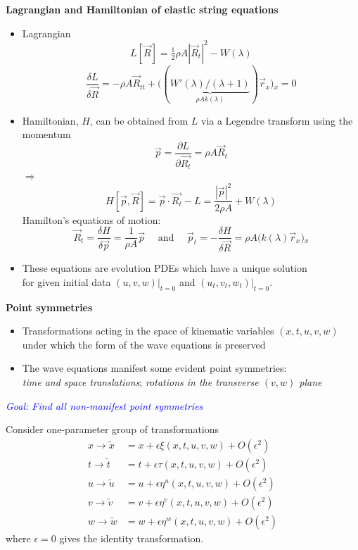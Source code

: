 \documentclass[landscape]{slides}
\def\myemph#1{\textcolor{blue}{\em #1}}
\begin{document}
\newpage
\begin{center}
\textbf{ Lagrangian and Hamiltonian of elastic string equations}
\end{center}
\begin{itemize}
\item
Lagrangian 
\[
L[\vec{R}] = \tfrac{1}{2}\rho A |\vec{R}_t|^2 - W(\lambda)
\]
\[
\frac{\delta L}{\delta \vec{R}} = -\rho A \vec{R}_{tt} + \big( (\underbrace{W'(\lambda) / (\lambda + 1)}_{\displaystyle \rho A k(\lambda) }) \vec{r}_x  \big){}_x = 0
\]
\item
Hamiltonian, $H$, can be obtained from $L$ via a Legendre transform using the momentum 
\[
\vec{p} = \dfrac{\partial L}{\partial \vec{R_t}} = \rho A \vec{R}_t
\]
$\Longrightarrow$
\[
H[\vec{p},\vec{R}] = \vec{p} \cdot \vec{R_t} - L 
= \frac{|\vec{p}|^2}{2 \rho A} + W(\lambda)
\]
Hamilton's equations of motion:
\[
\vec{R}_t = \frac{\delta H}{\delta \vec{p}} = \frac{1}{\rho A}\vec{p}
\quad\text{  and }\quad
\vec{p}_t = -\frac{\delta H}{\delta \vec{R}} 
= \rho A \big( k(\lambda) \vec{r}_x  \big){}_x 
\]
\item
These equations are evolution PDEs which have a unique solution\\
for given initial data $(u,v,w)\big|_{t=0}$ and $(u_t,v_t,w_t)\big|_{t=0}$. 
\end{itemize}


\newpage
\begin{center}
\textbf{Point symmetries}
\end{center}

\begin{itemize}
\item 
Transformations acting in the space of kinematic variables $(x,t,u,v,w)$
under which the form of the wave equations is preserved 
\item 
The wave equations manifest some evident point symmetries: \\
\emph{time and space translations}; \emph{rotations in the transverse $(v,w)$ plane}
\end{itemize}
\hfil

\begin{center}
\myemph{Goal: Find all non-manifest point symmetries}
\end{center}
\hfil

Consider one-parameter group of transformations 
\begin{align*}
x \to \tilde{x} & = x + \epsilon \xi(x,t,u,v,w) + O(\epsilon^2) \\
t \to \tilde{t} & = t + \epsilon \tau(x,t,u,v,w) + O(\epsilon^2) \\
u \to \tilde{u} & =  u + \epsilon \eta^u(x,t,u,v,w) + O(\epsilon^2) \\
v \to \tilde{v} & = v + \epsilon \eta^v(x,t,u,v,w) + O(\epsilon^2) \\
w \to \tilde{w} & = w + \epsilon \eta^w(x,t,u,v,w) + O(\epsilon^2) 
\end{align*}
where $\epsilon = 0$ gives the identity transformation. 
\end{document}
